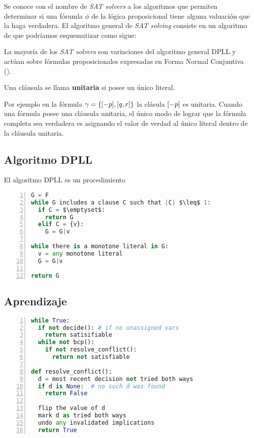 Se conoce con el nombre de \emph{SAT solvers} a los algoritmos que permiten
determinar si una fórumla $\phi$ de la lógica proposicional tiene alguna
valuación que la haga verdadera. El algoritmo general de  \emph{SAT solving}
consiste en un algoritmo de \bt que podríamos esquematizar como sigue:



La mayoría de los \emph{SAT solvers} son
variaciones del algoritmo general
DPLL\cite{Davis:1962:MPT:368273.368557} y actúan sobre fórmulas
proposicionales expresadas en Forma Normal Conjuntiva (\cnf).



\begin{definition} 
 Una cláusula se llama \textbf{unitaria} si
posee un único literal.
\end{definition}
Por ejemplo
en la fórmula $\gamma = \{[-p], [q, r]\}$ la clásula $[-p]$ es
unitaria. Cuando una fórmula \cnf posee una cláusula unitaria, el único modo de
lograr que la fórmula completa sea verdadera es asignando el valor de verdad
\true al único literal dentro de la cláusula unitaria.

\subsection{Algoritmo DPLL}

El algoritmo DPLL es un procedimiento 

\begin{lstlisting}[mathescape,language=Python,frame=single,numbers=left,caption={Algoritmo
DPLL}] G = F
while G includes a clause C such that |C| $\leq$ 1:
  if C = $\emptyset$:
    return G
  elif C = {v}:
    G = G|v

while there is a monotone literal in G:
  v = any monotone literal
  G = G|v

return G
\end{lstlisting}

\subsection{Aprendizaje}
\begin{lstlisting}[mathescape,language=Python,frame=single,numbers=left,caption={Algoritmo
CDCL}]
while True:
  if not decide(): # if no unassigned vars
    return satisifiable
  while not bcp():
    if not resolve_conflict():
      return not satisfiable

def resolve_conflict():
  d = most recent decision not tried both ways
  if d is None:  # no such d was found
    return False
      
  flip the value of d
  mark d as tried both ways
  undo any invalidated implications
  return True
\end{lstlisting}
